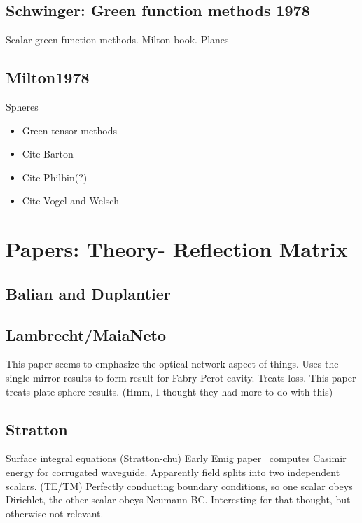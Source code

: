 \subsection{Schwinger: Green function methods 1978}

\cite{Schwinger1978, Milton1978}

Scalar green function methods.  Milton book.  
Planes

\subsection{Milton1978}
Spheres

\begin{itemize}
\item Green tensor methods
\item Cite Barton
\item Cite Philbin(?)
\item Cite Vogel and Welsch
\end{itemize}

\section{Papers: Theory- Reflection Matrix}

\subsection{Balian and Duplantier}
\cite{Balian1977} \cite{Balian1978}
\subsection{Lambrecht/MaiaNeto}

\cite{Lambrecht2006}
This paper seems to emphasize the optical network aspect of things.  
Uses the single mirror results to form result for Fabry-Perot cavity.
Treats loss.  
\cite{MaiaNeto2008}
This paper treats plate-sphere results.  (Hmm, I thought they had more to do with this)

\cite{Canaguier-Durand2012}

\subsection{Stratton}
Surface integral equations (Stratton-chu)
\cite{Stratton1941}
Early Emig paper~\cite{Emig2001} computes Casimir energy for corrugated waveguide.
Apparently field splits into two independent scalars.  (TE/TM)
Perfectly conducting boundary conditions, so one scalar obeys Dirichlet, 
the other scalar obeys Neumann BC.
 Interesting for that thought, but otherwise not relevant.  

